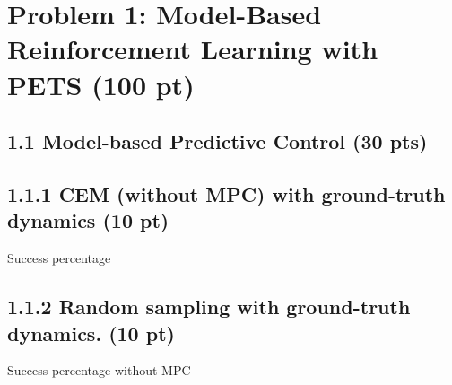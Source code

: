 \documentclass[12pt]{article}
\begin{document}
    
\newpage
\section*{Problem 1: Model-Based Reinforcement Learning with PETS (100 pt)}
\subsection*{1.1 Model-based Predictive Control (30 pts)}

\subsection*{1.1.1 CEM (without MPC) with ground-truth dynamics (10 pt)}

Success percentage
\begin{tcolorbox}[fit,height=1cm, width=5cm, blank, borderline={1pt}{1pt},nobeforeafter]
\begin{center}
\end{center}
\end{tcolorbox}

\subsection*{1.1.2 Random sampling with ground-truth dynamics. (10 pt)}

Success percentage without MPC 
\begin{tcolorbox}[fit,height=1cm, width=5cm, blank, borderline={1pt}{1pt},nobeforeafter]
\begin{center}
\end{center}
\end{tcolorbox}
\end{document}
